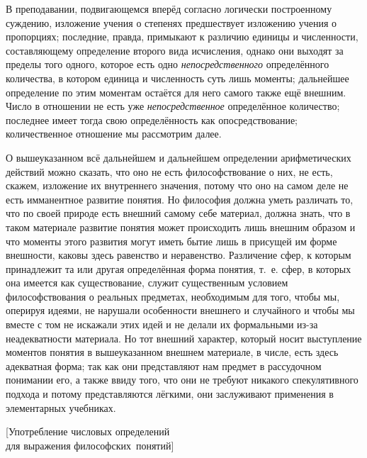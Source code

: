 В преподавании, подвигающемся вперёд согласно логически построенному суждению,
изложение учения о степенях предшествует изложению учения о пропорциях;
последние, правда, примыкают к различию единицы и численности, составляющему
определение второго вида исчисления, однако они выходят за пределы того одного,
которое есть одно {\em непосредственного} определённого количества, в котором
единица и численность суть лишь моменты; дальнейшее определение по этим
моментам остаётся для него самого также ещё внешним. Число в отношении не
есть уже {\em непосредственное} определённое количество; последнее имеет тогда
свою определённость как опосредствование; количественное отношение мы
рассмотрим далее.

О вышеуказанном всё дальнейшем и дальнейшем определении арифметических действий
можно сказать, что оно не есть философствование о них, не есть, скажем,
изложение их внутреннего значения, потому что оно на самом деле не есть
имманентное развитие понятия. Но философия должна уметь различать то, что по
своей природе есть внешний самому себе материал, должна знать, что в таком
материале развитие понятия может происходить лишь внешним
образом и что моменты этого развития могут иметь бытие лишь в присущей
им форме внешности, каковы здесь равенство и неравенство. Различение
сфер, к которым принадлежит та или другая определённая форма понятия, т.~е.
сфер, в которых она имеется как существование, служит существенным условием
философствования о реальных предметах, необходимым для того, чтобы мы, оперируя идеями, не
нарушали особенности внешнего и случайного и чтобы мы вместе с том не искажали
этих идей и не делали их формальными из-за неадекватности материала.
Но тот внешний характер, который носит выступление моментов понятия в
вышеуказанном внешнем материале, в числе, есть здесь адекватная форма; так
как они представляют нам предмет в рассудочном понимании его, а также ввиду того, что
они не требуют никакого спекулятивного подхода и потому представляются лёгкими,
они заслуживают применения в элементарных учебниках.

%
{[Употребление числовых определений\\ для выражения философских~понятий]}

